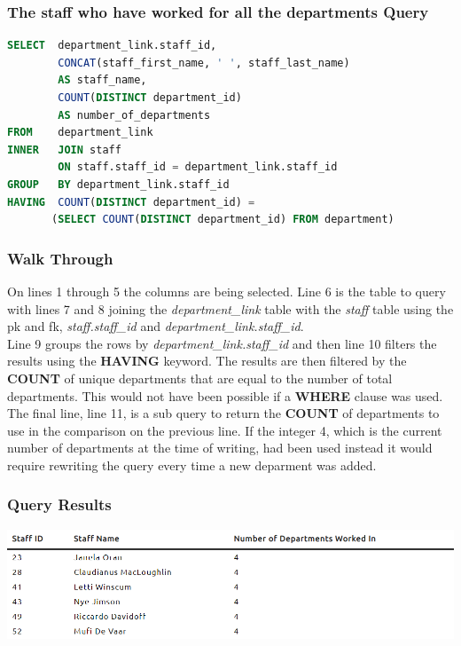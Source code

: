 \documentclass{article}
\begin{document}
\subsubsection{The staff who have worked for all the departments Query}
\begin{lstlisting}[language=sql, caption=The staff who have worked for all the departments Query, style=mystyle]
SELECT  department_link.staff_id,
        CONCAT(staff_first_name, ' ', staff_last_name) 
        AS staff_name, 
        COUNT(DISTINCT department_id) 
        AS number_of_departments 
FROM    department_link
INNER   JOIN staff 
        ON staff.staff_id = department_link.staff_id
GROUP   BY department_link.staff_id
HAVING  COUNT(DISTINCT department_id) = 
       (SELECT COUNT(DISTINCT department_id) FROM department)
\end{lstlisting} 

\subsubsection{Walk Through} On lines 1 through 5 the columns are being selected. Line 6 is the table to query with lines 7 and 8 joining the \textit{department\_link} table with the \textit{staff} table using the \acrshort{pk} and \acrshort{fk}, \textit{staff.staff\_id} and \textit{department\_link.staff\_id}.
\\\newline
Line 9 groups the rows by \textit{department\_link.staff\_id} and then line 10 filters the results using the \textbf{HAVING} keyword. The results are then filtered by the \textbf{COUNT} of unique departments that are equal to  the number of total departments. This would not have been possible if a \textbf{WHERE} clause was used.
\\\newline
The final line, line 11, is a sub query to return the \textbf{COUNT} of departments to use in the comparison on the previous line. If the integer 4, which is the current number of departments at the time of writing, had been used instead it would require rewriting the query every time a new deparment was added.

\subsubsection{Query Results}
\includegraphics[width=\linewidth]{images/09.png}
\end{document}
